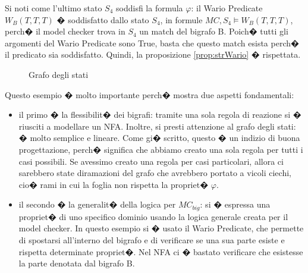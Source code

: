 Si noti come l'ultimo stato $S_4$ soddisfi la formula $\varphi$:  il Wario Predicate \\$W_B(T,T,T)$ � soddisfatto dallo stato $S_4$, in formule $MC,S_4 \models W_B(T,T,T)$, perch� il model checker trova in $S_4$ un match del bigrafo B. Poich� tutti gli argomenti del Wario Predicate sono True, basta che questo match esista perch� il predicato sia soddisfatto. Quindi, la proposizione \ref{prop:strWario} � rispettata.




\begin{figure}[th]
\centering
{}

\caption{Grafo degli stati \label{fig:BSGAutomata}}
\end{figure}


Questo esempio � molto importante perch� mostra due aspetti fondamentali:
\begin{itemize}
	\item
	il primo � la flessibilit� dei bigrafi: tramite una sola regola di reazione si � riusciti a modellare un NFA. Inoltre, si presti attenzione al grafo degli stati: � molto semplice e lineare. Come gi� scritto, questo � un indizio di buona progettazione, perch� significa che abbiamo creato una sola regola per tutti i casi possibili. Se avessimo creato una regola per casi particolari, allora ci sarebbero state diramazioni del grafo che avrebbero portato a vicoli ciechi, cio� rami in cui la foglia non rispetta la propriet� $\varphi$.
	\item
	il secondo � la generalit� della logica per $MC_{big}$: si � espressa una propriet� di uno specifico dominio usando la logica generale creata per il model checker. In questo esempio si � usato il Wario Predicate, che permette di spostarsi all'interno del bigrafo e di verificare se una sua parte esiste e rispetta determinate propriet�. Nel NFA ci � bastato verificare che esistesse la parte denotata dal bigrafo B.
\end{itemize}

